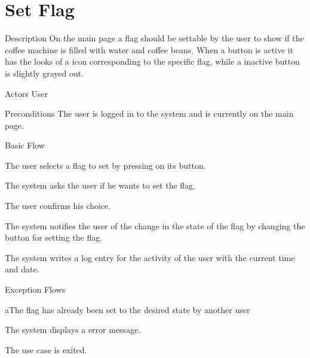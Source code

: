 \section{Set Flag}

%
\begin{cpart}{Description}
On the main page a flag should be settable by the user to show if the coffee machine is filled with water and coffee beans. When a button is active it has the looks of a icon corresponding to the specific flag, while a inactive button is slightly grayed out.
\end{cpart}


%
\begin{cpart}{Actors}
User
\end{cpart}

%
\begin{cpart}{Preconditions}
The user is logged in to the system and is currently on the main page.
\end{cpart}

%
\begin{cpartList}{Basic Flow}
  \item The user selects a flag to set by pressing on its button.
  \item The system asks the user if he wants to set the flag.
  \item The user confirms his choice.
  \item The system notifies the user of the change in the state of the flag by changing the button for setting the flag.
  \item The system writes a log entry for the activity of the user with the current time and date.
\end{cpartList}

%
\begin{cpartList}{Exception Flows}
  \begin{innerList}{4}{a}{The flag has already been set to the desired state by another user}
    \item The system displays a error message.
    \item The use case is exited.
  \end{innerList}
\end{cpartList}

\clearpage
